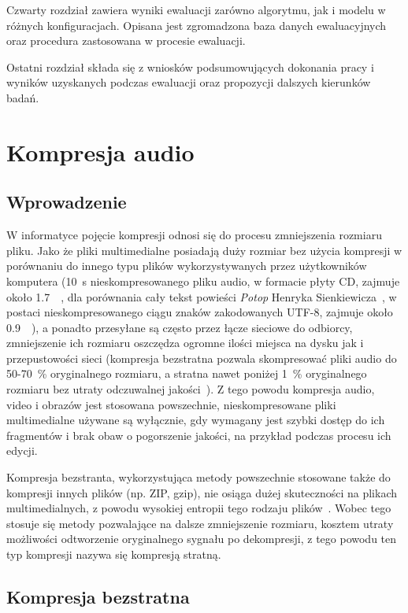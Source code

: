 \documentclass[pl,12pt]{aghdpl}
\let\Oldchapter\chapter%
\renewcommand{\chapter}{\FloatBarrier\Oldchapter}
\let\Oldsection\section%
\renewcommand{\section}{\FloatBarrier\Oldsection}
\begin{document}
Czwarty rozdział zawiera wyniki ewaluacji zarówno algorytmu, jak i modelu w
różnych konfiguracjach. Opisana jest zgromadzona baza danych ewaluacyjnych oraz
procedura zastosowana w procesie ewaluacji.

Ostatni rozdział składa się z wniosków podsumowujących dokonania pracy i
wyników uzyskanych podczas ewaluacji oraz propozycji dalszych kierunków badań.

\chapter{Kompresja audio}
\section{Wprowadzenie}
W informatyce pojęcie kompresji odnosi się do procesu zmniejszenia rozmiaru
pliku. Jako że pliki multimedialne posiadają duży rozmiar bez użycia kompresji
w porównaniu do innego typu plików wykorzystywanych przez użytkowników
komputera (\SI{10}{\second} nieskompresowanego pliku audio, w formacie płyty
CD, zajmuje około \SI{1.7}{\mebi\byte}, dla porównania cały tekst powieści
\textit{Potop} Henryka Sienkiewicza~\cite{Sienkiewicz2010}, w postaci
nieskompresowanego ciągu znaków zakodowanych UTF-8, zajmuje około
\SI{0.9}{\mebi\byte}), a ponadto przesyłane są często przez łącze sieciowe do
odbiorcy, zmniejszenie ich rozmiaru oszczędza ogromne ilości miejsca na dysku
jak i przepustowości sieci (kompresja bezstratna pozwala skompresować pliki
audio do \num{50}-\SI{70}{\percent} oryginalnego rozmiaru, a stratna nawet
poniżej \SI{1}{\percent} oryginalnego rozmiaru bez utraty odczuwalnej jakości~\cite{Beurden2015, kamedo22014}). Z tego powodu kompresja audio, video i
obrazów jest stosowana powszechnie, nieskompresowane pliki multimedialne
używane są wyłącznie, gdy wymagany jest szybki dostęp do ich fragmentów i brak
obaw o pogorszenie jakości, na przykład podczas procesu ich edycji.

Kompresja bezstranta, wykorzystująca metody powszechnie stosowane także do
kompresji innych plików (np. ZIP, gzip), nie osiąga dużej skuteczności na
plikach multimedialnych, z powodu wysokiej entropii tego rodzaju plików~\cite{Sayood2002}. Wobec tego stosuje się metody pozwalające na dalsze
zmniejszenie rozmiaru, kosztem utraty możliwości odtworzenie oryginalnego
sygnału po dekompresji, z tego powodu ten typ kompresji nazywa się kompresją
stratną.

\section{Kompresja bezstratna}
\end{document}

